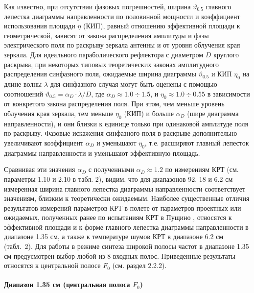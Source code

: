 Как известно, при отсутствии фазовых погрешностей,
ширина $\vartheta_{0.5}$ главного лепестка диаграммы
направленности по
половинной мощности и коэффициент использования площади
$\eta$ (КИП), равный отношению эффективной площади к
геометрической, зависят от закона распределения амплитуды
и фазы электрического поля по раскрыву зеркала антенны
и от уровня облучения края зеркала.
Для идеального параболического рефлектора с
диаметром $D$ круглого раскрыва, при некоторых
типовых теоретических законах амплитудного распределения
синфазного поля, ожидаемые ширина диаграммы $\vartheta_{0.5}$ и КИП $\eta_0$
на длине волны $\lambda$
для синфазного случая могут быть оценены с помощью соотношений
 \cite{}
$\vartheta_{0.5} = \alpha_D \cdot \lambda / D$,
где $\alpha_D \approx 1.0 \div 1.5$, и $\eta_0 \approx 1.0 \div 0.55$
в зависимости от конкретого закона распределения поля.
При этом, чем меньше уровень облучения края зеркала,
тем меньше $\eta_0$ (КИП) и больше $\alpha_D$ (шире диаграмма
направленности), и они близки к единице только при одинаковой
амплитуде поля по раскрыву. Фазовые искажения синфазного поля
в раскрыве дополнительно увеличивают коэффициент $\alpha_D$ и
уменьшают $\eta_0$, т.е. расширяют главный лепесток диаграммы
направленности и уменьшают эффективную площадь.

Сравнивая эти значения $\alpha_D$ с полученными
$\alpha_D \approx 1.2$ по измерениям КРТ
(см. параметры 1.10 и 2.10 в табл. 2),
видим, что для диапазонов 92, 18 и 6.2 см
измеренная ширина главного лепестка диаграммы направленности
соответствует значениям, близким к теоретически ожидаемым.
Наиболее существенные отличия результатов измерений параметров
КРТ в полете от параметров проектных или ожидаемых, полученных ранее
по испытаниям КРТ в Пущино \cite{}, относятся
к эффективной площади и к форме
главного лепестка диаграммы направленности в диапазоне 1.35 см,
а также к температуре шумов КРТ в диапазоне 6.2 см (табл.~2).
Для работы в режиме синтеза широкой полосы частот в диапазоне 1.35 см
предусмотрен выбор любой из 8 входных полос.
Приведенные результаты относятся к центральной полосе $F_0$
(см. раздел 2.2.2).

\paragraph{Диапазон 1.35 см (центральная полоса $F_0$)}

